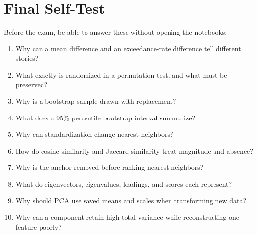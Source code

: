 \documentclass[11pt]{article}
\begin{document}
\section{Final Self-Test}
Before the exam, be able to answer these without opening the notebooks:
\begin{enumerate}
	\item Why can a mean difference and an exceedance-rate difference tell different stories?
	\item What exactly is randomized in a permutation test, and what must be preserved?
	\item Why is a bootstrap sample drawn with replacement?
	\item What does a 95\% percentile bootstrap interval summarize?
	\item Why can standardization change nearest neighbors?
	\item How do cosine similarity and Jaccard similarity treat magnitude and absence?
	\item Why is the anchor removed before ranking nearest neighbors?
	\item What do eigenvectors, eigenvalues, loadings, and scores each represent?
	\item Why should PCA use saved means and scales when transforming new data?
	\item Why can a component retain high total variance while reconstructing one feature poorly?
\end{enumerate}
\end{document}
